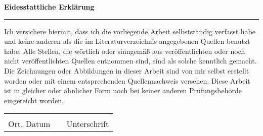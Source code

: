 
\begin{addmargin}[0cm]{0cm}
		\begin{center}
			\LARGE{\textbf{Eidesstattliche Erklärung}}\\
			\rule{\textwidth}{0.04cm}	
		\end{center}
		Ich versichere hiermit, dass ich die vorliegende Arbeit selbstständig verfasst habe und keine anderen als die im Literaturverzeichnis angegebenen Quellen benutzt habe.
		Alle Stellen, die wörtlich oder sinngemäß aus veröffentlichten oder noch nicht veröffentlichten Quellen entnommen sind, sind als solche kenntlich gemacht.
		Die Zeichnungen oder Abbildungen in dieser Arbeit sind von mir selbst erstellt worden oder mit einem entsprechenden Quellennachweis versehen.
		Diese Arbeit ist in gleicher oder ähnlicher Form noch bei keiner anderen Prüfungsbehörde eingereicht	worden.
		\begin{center}
			\vspace{1.5cm}
			\begin{tabular}{lp{2em}l}
				\hspace{5cm}   && \hspace{5cm} \\
				\cline{1-1}\cline{3-3}
				Ort, Datum  && \hfill Unterschrift
			\end{tabular} 
		\end{center}
\end{addmargin}
\cleardoublepage